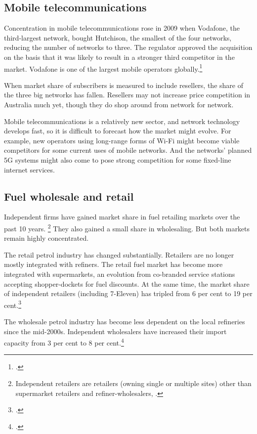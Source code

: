 \subsection{Mobile telecommunications}

Concentration in mobile telecommunications rose in 2009 when Vodafone, the third-largest network, bought Hutchison, the smallest of the four networks, reducing the number of networks to three. The regulator approved the acquisition on the basis that it was likely to result in a stronger third competitor in the market. Vodafone is one of the largest mobile operators globally.\footcite{ACCC_mobile_2009}

When market share of subscribers is measured to include resellers, the share of the three big networks has fallen. Resellers may not increase price competition in Australia much yet, though they do shop around from network for network.

Mobile telecommunications is a relatively new sector, and network technology develops fast, so it is difficult to forecast how the market might evolve. For example, new operators using long-range forms of Wi-Fi might become viable competitors for some current uses of mobile networks. And the networks' planned 5G systems might also come to pose strong competition for some fixed-line internet services.

\subsection{Fuel wholesale and retail}

Independent firms have gained market share in fuel retailing markets over the past 10 years.%
\footnote{Independent retailers are retailers (owning single or multiple sites) other than supermarket retailers and refiner-wholesalers, \textcite{ACCC_Petrol_2014}.} They also gained a small share in wholesaling. But both markets remain highly concentrated.%

The retail petrol industry has changed substantially. Retailers are no longer mostly integrated with refiners. The retail fuel market has become more integrated with supermarkets, an evolution from co-branded service stations accepting shopper-dockets for fuel discounts. At the same time, the market share of independent retailers (including 7-Eleven) has tripled from 6 per cent to 19 per cent.\footcite{ACCC_Petrol_2014}

The wholesale petrol industry has become less dependent on the local refineries since the mid-2000s. Independent wholesalers have increased their import capacity from 3 per cent to 8 per cent.\footcite{ACCC_Petrol_2014}

